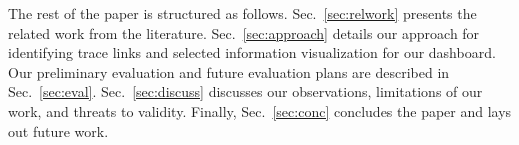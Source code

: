 

The rest of the paper is structured as follows. Sec.~\ref{sec:relwork} presents the related work from the literature. Sec.~\ref{sec:approach} details our approach for identifying trace links and selected information visualization for our dashboard. Our preliminary evaluation and future evaluation plans are described in Sec.~\ref{sec:eval}. Sec.~\ref{sec:discuss} discusses our observations, limitations of our work, and threats to validity. Finally, Sec.~\ref{sec:conc} concludes the paper and lays out future work.

